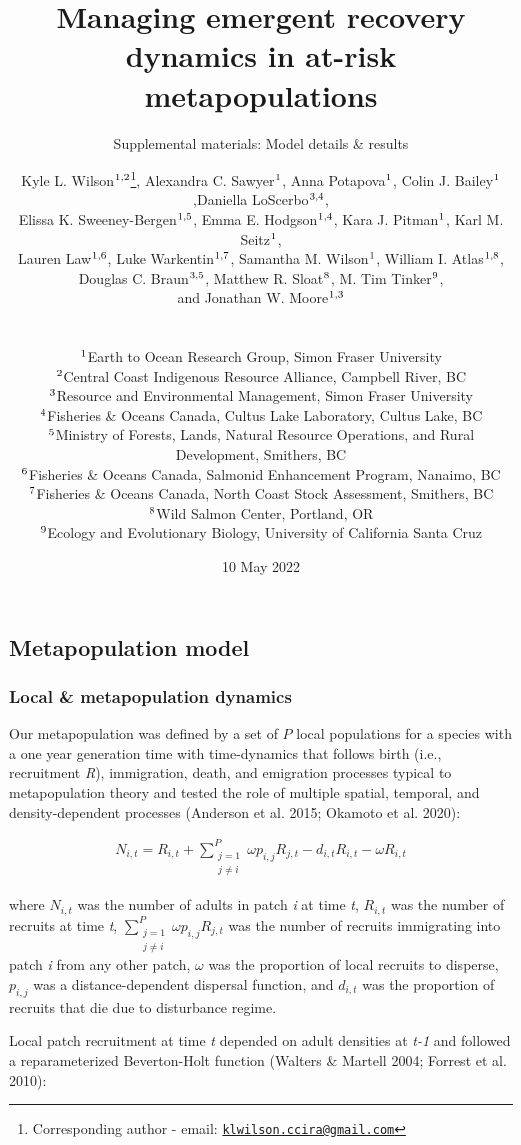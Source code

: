 \documentclass[
]{article}
\title{Managing emergent recovery dynamics in at-risk metapopulations}
\subtitle{Supplemental materials: Model details \& results}
\author{Kyle L. Wilson\(^\textup{1,2}\)\footnote{Corresponding author -
  email:
  \href{mailto:klwilson.ccira@gmail.com}{\nolinkurl{klwilson.ccira@gmail.com}}},
Alexandra C. Sawyer\(^\textup{1}\), Anna Potapova\(^\textup{1}\), Colin
J. Bailey\(^\textup{1}\),Daniella LoScerbo\(^\textup{3,4}\),\\
Elissa K. Sweeney-Bergen\(^\textup{1,5}\), Emma E.
Hodgson\(^\textup{1,4}\), Kara J. Pitman\(^\textup{1}\), Karl M.
Seitz\(^\textup{1}\),\\
Lauren Law\(^\textup{1,6}\), Luke Warkentin\(^\textup{1,7}\), Samantha
M. Wilson\(^\textup{1}\), William I. Atlas\(^\textup{1,8}\),\\
Douglas C. Braun\(^\textup{3,5}\), Matthew R. Sloat\(^\textup{8}\), M.
Tim Tinker\(^\textup{9}\),\\
and Jonathan W. Moore\(^\textup{1,3}\)\\
\strut \\
\(^\textup{1}\)Earth to Ocean Research Group, Simon Fraser University\\
\(^\textup{2}\)Central Coast Indigenous Resource Alliance, Campbell
River, BC\\
\(^\textup{3}\)Resource and Environmental Management, Simon Fraser
University\\
\(^\textup{4}\)Fisheries \& Oceans Canada, Cultus Lake Laboratory,
Cultus Lake, BC\\
\(^\textup{5}\)Ministry of Forests, Lands, Natural Resource Operations,
and Rural Development, Smithers, BC\\
\(^\textup{6}\)Fisheries \& Oceans Canada, Salmonid Enhancement Program,
Nanaimo, BC\\
\(^\textup{7}\)Fisheries \& Oceans Canada, North Coast Stock Assessment,
Smithers, BC\\
\(^\textup{8}\)Wild Salmon Center, Portland, OR\\
\(^\textup{9}\)Ecology and Evolutionary Biology, University of
California Santa Cruz}
\date{10 May 2022}
\begin{document}
\maketitle

\centering
\raggedright
\renewcommand{\baselinestretch}{1}\normalsize
\tableofcontents
\renewcommand{\baselinestretch}{0.75}\normalsize
\newpage

\pagestyle{fancy}

\hypertarget{metapopulation-model}{%
\subsection{Metapopulation model}\label{metapopulation-model}}

\hypertarget{local-metapopulation-dynamics}{%
\subsubsection{Local \& metapopulation
dynamics}\label{local-metapopulation-dynamics}}

Our metapopulation was defined by a set of \(P\) local populations for a
species with a one year generation time with time-dynamics that follows
birth (i.e., recruitment \emph{R}), immigration, death, and emigration
processes typical to metapopulation theory and tested the role of
multiple spatial, temporal, and density-dependent processes (Anderson et
al. 2015; Okamoto et al. 2020):

\begin{align}
N_{i,t}= R_{i,t}+{\sum\limits_{\substack{j=1 \\ j\neq i}}^{P} \omega p_{i,j}R_{j,t}}-d_{i,t}R_{i,t}-\omega R_{i,t}
\end{align}

where \(N_{i,t}\) was the number of adults in patch \emph{i} at time
\emph{t}, \(R_{i,t}\) was the number of recruits at time \emph{t},
\({\sum\limits_{\substack{j=1 \\ j\neq i}}^{P} \omega p_{i,j}R_{j,t}}\)
was the number of recruits immigrating into patch \emph{i} from any
other patch, \(\omega\) was the proportion of local recruits to
disperse, \(p_{i,j}\) was a distance-dependent dispersal function, and
\(d_{i,t}\) was the proportion of recruits that die due to disturbance
regime.

Local patch recruitment at time \emph{t} depended on adult densities at
\emph{t-1} and followed a reparameterized Beverton-Holt function
(Walters \& Martell 2004; Forrest et al. 2010):
\end{document}
